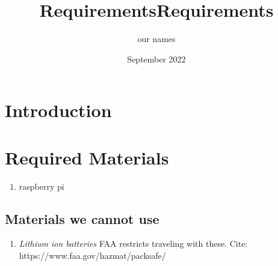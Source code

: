 \documentclass[12pt, letterpaper]{article}
\title{Requirements}
\author{our names}
\date{September 2022}
\begin{document}
\maketitle
\pagestyle{plain}

\title{Requirements}

\section{Introduction}

\section{Required Materials}
\begin{enumerate}
\item raspberry pi
\end{enumerate}

\subsection{Materials we cannot use}
\begin{enumerate}
\item \textit{Lithium ion batteries} FAA restricts traveling with these. Cite: https://www.faa.gov/hazmat/packsafe/
\end{enumerate}
\end{document}
